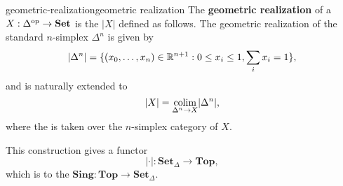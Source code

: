 \begin{topic}{geometric-realization}{geometric realization}
    The \textbf{geometric realization} of a  $X : \Delta^\textup{op} \to \textbf{Set}$ is the  $|X|$ defined as follows. The geometric realization of the standard $n$-simplex $\Delta^n$ is given by
    \[ |\Delta^n| = \{ (x_0, \ldots, x_n) \in \mathbb{R}^{n + 1} : 0 \le x_i \le 1, \sum_i x_i = 1 \} , \]
    and is naturally extended to
    \[ |X| = \underset{\Delta^n \to X}{\textup{colim}} |\Delta^n| , \]
    where the  is taken over the $n$-simplex category of $X$.
    
    This construction gives a functor
    \[ |\cdot| : \textbf{Set}_\Delta \to \textbf{Top} , \]
    which is  to the  $\textbf{Sing} : \textbf{Top} \to \textbf{Set}_\Delta$.
\end{topic}
